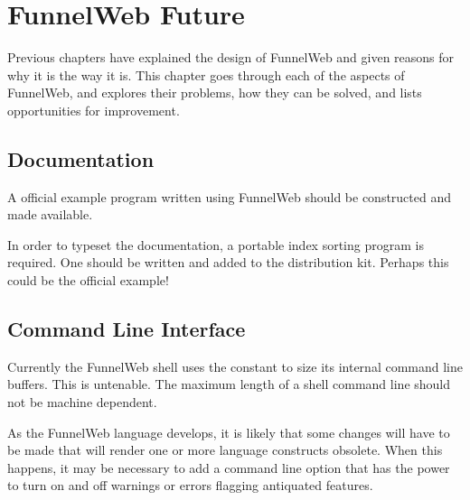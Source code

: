 %
%

\chapter{FunnelWeb Future}
\label{chapfuture}

Previous chapters have explained the design of FunnelWeb and given reasons
for why it is the way it is. This chapter goes through each of the
aspects of FunnelWeb, and explores their problems, how they can be solved,
and lists opportunities for improvement.

\section{Documentation}

 A official example program written using
FunnelWeb should be constructed and made available.

 In order to typeset the documentation, a portable
index sorting program is required. One should be written and added to the
distribution kit. Perhaps this could be the official
example!

\section{Command Line Interface}

 Currently the FunnelWeb shell uses the
 constant to size its internal command line buffers.
This is untenable. The maximum length of a shell command line should
not be machine dependent.

 As the FunnelWeb language develops, it is likely
that some changes will have to be made that will render one or more
language constructs obsolete. When this happens, it may be necessary to
add a command line option that has the power to turn on and off warnings or
errors flagging antiquated features.

